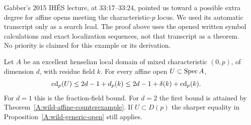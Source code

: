 \begin{remark}
Gabber's 2015 IH\'ES lecture, at 33:17--33:24, pointed us toward a
possible extra degree for affine opens meeting the characteristic-$p$
locus. We used its automatic transcript only as a search lead.
The proof above uses the opened written symbol calculations and exact
localization sequences, not that transcript as a theorem.
No priority is claimed for this example or its derivation.
\end{remark}

\begin{theorem}
\label{A:wild-affine-upper}
Let $A$ be an excellent henselian local domain of mixed characteristic
$(0,p)$, of dimension $d$, with residue field $k$. For every affine open
$U\subset\operatorname{Spec} A$,
\[
 \operatorname{cd}_p(U)\leq2d-1+d_p(k)
       \leq2d-1+\delta(k)+\operatorname{cd}_p(k).
\]
For $d=1$ this is the fraction-field bound. For $d=2$ the first bound
is attained by Theorem~\ref{A:wild-affine-counterexample}. If
$U\subset D(p)$ the sharper equality in
Proposition~\ref{A:wild-generic-open} still applies.
\end{theorem}
